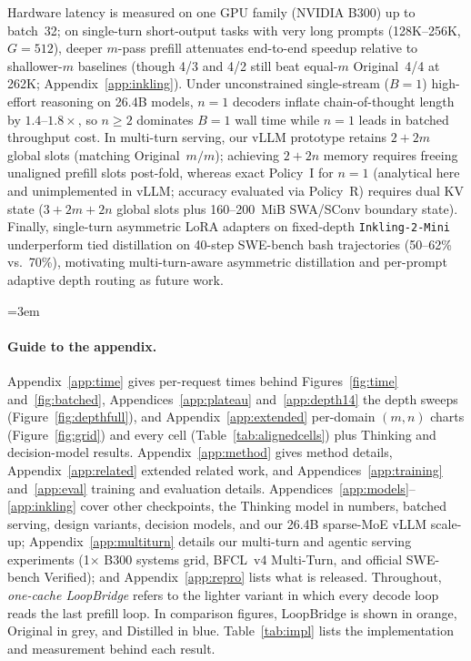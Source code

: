 \documentclass[11pt]{article}
\begin{document}
Hardware latency is measured on one GPU family (NVIDIA B300) up to batch~32; on single-turn short-output tasks with very
long prompts (128K--256K, $G{=}512$), deeper $m$-pass prefill attenuates end-to-end speedup relative to shallower-$m$
baselines (though 4/3 and 4/2 still beat equal-$m$ Original~4/4 at 262K; Appendix~\ref{app:inkling}). Under
unconstrained single-stream ($B{=}1$) high-effort reasoning on 26.4B models, $n{=}1$ decoders inflate chain-of-thought
length by $1.4$--$1.8\times$, so $n{\ge}2$ dominates $B{=}1$ wall time while $n{=}1$ leads in batched throughput cost.
In multi-turn serving, our vLLM prototype retains $2{+}2m$ global slots (matching Original~$m/m$); achieving $2{+}2n$
memory requires freeing unaligned prefill slots post-fold, whereas exact Policy~I for $n{=}1$ (analytical here and
unimplemented in vLLM; accuracy evaluated via Policy~R) requires dual KV state
($3{+}2m{+}2n$ global slots plus 160--200~MiB SWA/SConv boundary state). Finally, single-turn asymmetric LoRA adapters on
fixed-depth \texttt{Inkling-2-Mini} underperform tied distillation on 40-step SWE-bench bash trajectories (50--62\% vs.\
70\%), motivating multi-turn-aware asymmetric distillation and per-prompt adaptive depth routing as future work.


\FloatBarrier
\begingroup\emergencystretch=3em

\endgroup

\clearpage
\appendix
\renewcommand{\dblfloatpagefraction}{0.65}\renewcommand{\floatpagefraction}{0.65}

\paragraph{Guide to the appendix.} Appendix~\ref{app:time} gives per-request times behind Figures~\ref{fig:time}
and~\ref{fig:batched}, Appendices~\ref{app:plateau} and~\ref{app:depth14} the depth sweeps (Figure~\ref{fig:depthfull}),
and Appendix~\ref{app:extended} per-domain $(m,n)$ charts (Figure~\ref{fig:grid}) and every cell (Table~\ref{tab:alignedcells})
plus Thinking and decision-model results. Appendix~\ref{app:method} gives method details, Appendix~\ref{app:related} extended related
work, and Appendices~\ref{app:training} and~\ref{app:eval} training and evaluation details.
Appendices~\ref{app:models}--\ref{app:inkling} cover other checkpoints, the Thinking model in numbers, batched serving,
design variants, decision models, and our 26.4B sparse-MoE vLLM scale-up; Appendix~\ref{app:multiturn} details our
multi-turn and agentic serving experiments (1$\times$ B300 systems grid, BFCL~v4 Multi-Turn, and official SWE-bench
Verified); and Appendix~\ref{app:repro} lists what is released.
Throughout, \emph{one-cache LoopBridge} refers to the lighter variant in which every decode loop reads the last prefill
loop. In comparison figures, LoopBridge is shown in orange, Original in grey, and Distilled in blue.
Table~\ref{tab:impl} lists the implementation and measurement behind each result.
\end{document}
